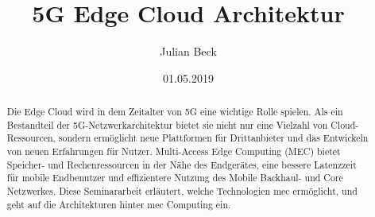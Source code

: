 \documentclass[runningheads]{llncs}
\title{5G Edge Cloud Architektur}
\author{Julian Beck}
\institute{Betreuer: Prof. Dr. rer. nat. Oliver Waldhorst}
\date{01.05.2019}
\numberwithin{figure}{section}
\begin{document}
\let\oldaddcontentsline\addcontentsline
\def\addcontentsline#1#2#3{}
\maketitle
\def\addcontentsline#1#2#3{\oldaddcontentsline{#1}{#2}{#3}}



\begin{abstract}
  Die Edge Cloud wird in dem Zeitalter von 5G eine wichtige Rolle spielen. 
  Als ein Bestandteil der 5G-Netzwerkarchitektur bietet sie nicht nur eine Vielzahl von Cloud-Ressourcen, sondern
  ermöglicht neue Plattformen für Drittanbieter und das Entwickeln von neuen Erfahrungen für Nutzer.
  Multi-Access Edge Computing (MEC) bietet Speicher- und Rechenressourcen in der Nähe des Endgerätes, 
  eine bessere Latenzzeit für mobile Endbenutzer und effizientere Nutzung des Mobile Backhaul-
  und Core Netzwerkes. Diese Seminararbeit erläutert, welche Technologien \acrfull{mec} ermöglicht, und geht auf die Architekturen 
  hinter \Acrshort{mec} Computing ein.
\end{abstract}

\tableofcontents 
\newpage
\printglossary[type=\acronymtype]
\newpage
\end{document}
